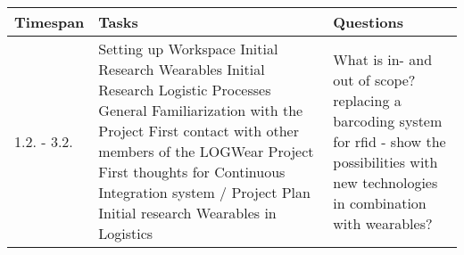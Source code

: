\documentclass{article}
\begin{document}
\begin{table}[htbp]
	\begin{center}
		\begin{tabular}{|p{0.15\linewidth}|p{0.55\linewidth}|p{0.3\linewidth}|} \hline
			\textbf{Timespan} & \textbf{Tasks} & \textbf{Questions} \\ \hline
            1.2. - 3.2. & 	Setting up Workspace \newline 
            				Initial Research Wearables \newline
            				Initial Research Logistic Processes \newline
            				General Familiarization with the Project \newline 
            				First contact with other members of the LOGWear Project \newline
            				First thoughts for Continuous Integration system / Project Plan \newline
            				Initial research Wearables in Logistics &
            				What is in- and out of scope? \newline
            				replacing a barcoding system for rfid - show the possibilities with new technologies in combination with wearables? \newline
            				\\ \hline
		\end{tabular}	
    \end{center}
\end{table}
\end{document}
